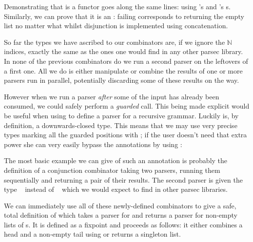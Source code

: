 
Demonstrating that  is a functor goes along the same
lines: using 's and 's s. Similarly,
we can prove that it is an : failing corresponds
to returning the empty list no matter what whilst disjunction is
implemented using concatenation.

\begin{minipage}{0.30\textwidth}
\end{minipage}
\begin{minipage}{0.55\textwidth}
\end{minipage}

So far the types we have ascribed to our combinators are, if we ignore
the $\mathbb{N}$ indices, exactly the
same as the ones one would find in any other parsec library. In none
of the previous combinators do we run a second parser on the leftovers
of a first one. All we do is either manipulate or combine the results
of one or more parsers run in parallel, potentially discarding some of
these results on the way.

However when we run a parser \emph{after} some of the input has already
been consumed, we could safely perform a \emph{guarded} call. This being
made explicit would be useful when using  to define a parser for
a recursive grammar. Luckily  is, by definition, a
downwards-closed type. This means that we may use very precise types marking
all the guarded positions with \BOX{}; if the user doesn't need that extra
power she can very easily bypass the \BOX{} annotations by using :


The most basic example we can give of such an annotation is probably the
definition of a conjunction combinator \AF{\_<\&>\_} taking two parsers,
running them sequentially and returning a pair of their results. The second
parser is given the type \mbox{\BOX{}  } instead of
\mbox{ } which we would expect to find in other parsec libraries.


We can immediately use all of these newly-defined combinators to give
a safe, total definition of  which takes a parser for 
and returns a parser for non-empty lists of s. It is defined as
a fixpoint and proceeds as follows: it either combines a head and a
non-empty tail using \AF{$\_::^{+}\_$} or returns a singleton list.

